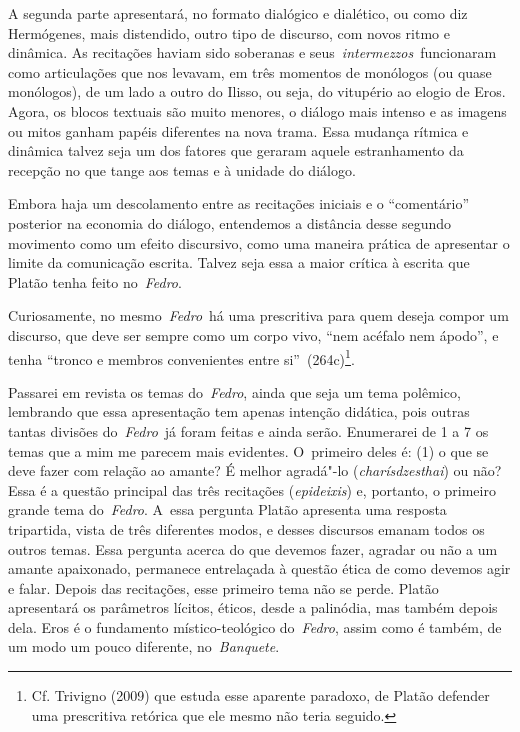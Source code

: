 A segunda parte apresentará, no formato dialógico e dialético, ou como
diz Hermógenes, mais distendido, outro tipo de discurso, com novos ritmo
e dinâmica. As recitações haviam sido soberanas e
seus~\emph{intermezzos}~funcionaram como articulações que nos levavam,
em três momentos de monólogos (ou quase monólogos), de um lado a outro
do Ilisso, ou seja, do vitupério ao elogio de Eros. Agora, os blocos
textuais são muito menores, o diálogo mais intenso e as imagens ou mitos
ganham papéis diferentes na nova trama. Essa mudança rítmica e dinâmica
talvez seja um dos fatores que geraram aquele estranhamento da recepção
no que tange aos temas e à unidade do diálogo.

Embora haja um descolamento entre as recitações iniciais e o ``comentário''
posterior na economia do diálogo, entendemos a distância desse segundo
movimento como um efeito discursivo, como uma maneira prática de
apresentar o limite da comunicação escrita. Talvez seja essa a maior
crítica à escrita que Platão tenha feito no~\emph{Fedro}.

Curiosamente, no mesmo~\emph{Fedro}~há uma prescritiva para quem deseja
compor um discurso, que deve ser sempre como um corpo vivo, ``nem
acéfalo nem ápodo'', e tenha ``tronco e membros convenientes entre
si''~(264c)\footnote{Cf. Trivigno (2009) que estuda esse aparente
  paradoxo, de Platão defender uma prescritiva retórica que ele mesmo
  não teria seguido.}.

Passarei em revista os temas do~\emph{Fedro}, ainda que seja um tema
polêmico, lembrando que essa apresentação tem apenas intenção didática,
pois outras tantas divisões do~\emph{Fedro}~já foram feitas e ainda
serão. Enumerarei de 1 a 7 os temas que a mim me parecem mais evidentes.
O~primeiro deles é: (1) o que se deve fazer com relação ao amante? É
melhor agradá"-lo (\emph{charísdzesthai}) ou não? Essa é a questão
principal das três recitações (\emph{epideixis}) e, portanto, o primeiro
grande tema do~\emph{Fedro}. A~essa pergunta Platão apresenta uma
resposta tripartida, vista de três diferentes modos, e desses discursos
emanam todos os outros temas. Essa pergunta acerca do que devemos fazer,
agradar ou não a um amante apaixonado, permanece entrelaçada à questão
ética de como devemos agir e falar. Depois das recitações, esse primeiro
tema não se perde. Platão apresentará os parâmetros lícitos, éticos,
desde a palinódia, mas também depois dela. Eros é o fundamento místico-teológico
 do~\emph{Fedro}, assim como é também, de um modo um pouco
diferente, no~\emph{Banquete}.

